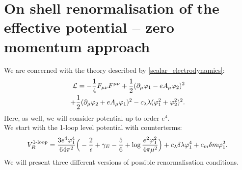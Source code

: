 \chapter{On shell renormalisation of the effective potential -- zero momentum approach}

We are concerned with the theory described by \ref{scalar_electrodynamics}:
\begin{align}
\mathcal{L} = -\frac{1}{4}F_{\mu\nu}F^{\mu\nu}+ 
\frac{1}{2}(\partial_\mu\varphi_1 - eA_\mu\varphi_2)^2\\
+\frac{1}{2}(\partial_\mu\varphi_2+eA_\mu\varphi_1)^2
-c_\lambda\lambda(\varphi_1^2+\varphi_2^2)^2. \notag
\end{align}
Here, as well, we will consider potential up to order $e^4$. \\
We start with the 1-loop level potential with counterterms:
\begin{align}
V_R^{\textrm{1-loop}} = \frac{3e^4\varphi_1^4}{64\pi^2}\Big(-\frac{2}{\epsilon}+\gamma_E-\frac{5}{6}+
\log{\frac{e^2\varphi_1^2}{4\pi\mu^2}}\Big) + c_\lambda\delta\lambda\varphi_1^4+c_m\delta m\varphi_1^2.
\end{align}
We will present three different versions of possible renormalisation conditions. 
